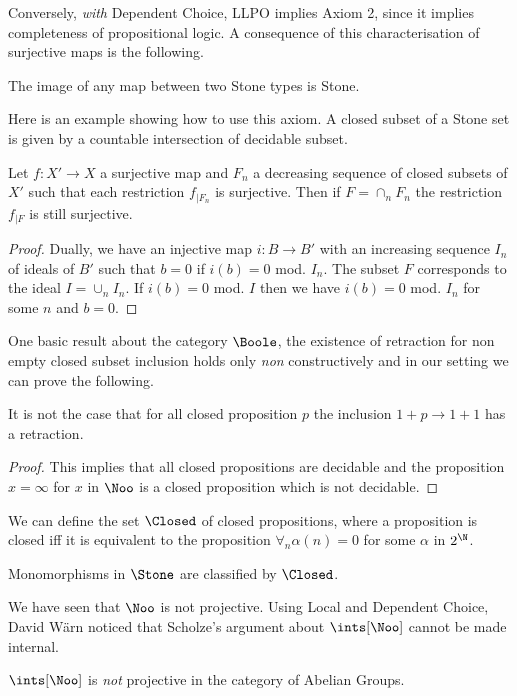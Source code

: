 Conversely, {\em with} Dependent Choice, LLPO implies Axiom 2, since it implies completeness of propositional logic.
A consequence of this characterisation of surjective maps is the following.

\begin{proposition}
  The image of any map between two Stone types is Stone.
\end{proposition}

Here is an example showing how to use this axiom. A closed subset of a Stone set is given by a countable
intersection of decidable subset.

\begin{proposition}
  Let $f:X'\rightarrow X$ a surjective map and $F_n$ a decreasing sequence of closed subsets of $X'$ such that
  each restriction $f_{|F_n}$ is surjective. Then if $F = \cap_n F_n$ the restriction $f_{|F}$ is still surjective.
\end{proposition}

\begin{proof}
  Dually, we have an injective map $i:B\rightarrow B'$ with an increasing sequence $I_n$ of ideals of $B'$ such that
  $b = 0$ if $i(b) = 0$ mod. $I_n$. The subset $F$ corresponds to the ideal $I = \cup_n I_n$. If $i(b) = 0$ mod. $I$
  then we have $i(b) = 0$ mod. $I_n$ for some $n$ and $b = 0$. 
\end{proof}



One basic result about the category $\Boole$, the existence of retraction for non empty closed subset inclusion
holds only {\em non} constructively and in our setting we can prove the following.


\begin{proposition}
 It is not the case that for all closed proposition $p$ the inclusion $1+p\rightarrow 1+1$ has a retraction.
\end{proposition}

\begin{proof}
  This implies that all closed propositions are decidable and the proposition $x=\infty$ for $x$ in $\Noo$ is a
  closed proposition which is not decidable.
\end{proof}

\medskip

We can define the set $\Closed$ of closed propositions, where a proposition is closed iff it is equivalent to
the proposition $\forall_n \alpha(n) = 0$ for some $\alpha$ in $2^{\N}$.

\begin{theorem}
  Monomorphisms in $\Stone$ are classified by $\Closed$.
\end{theorem}

\medskip

We have seen that $\Noo$ is not projective. Using Local and Dependent Choice, David Wärn noticed that Scholze's argument
about $\ints[\Noo]$ cannot be made internal.

\begin{theorem}
   $\ints[\Noo]$ is {\em not} projective in the category of Abelian Groups.
\end{theorem}
